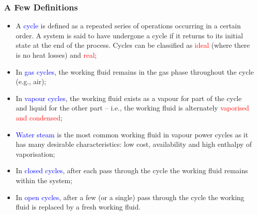 \documentclass[10pt,compress]{beamer}
\newcommand{\red}{\textcolor{red}}
\newcommand{\blue}{\textcolor{blue}}
\begin{document}
\begin{frame}
 \frametitle{A Few Definitions}
 \begin{itemize}
    \item<1-> A \blue{cycle} is defined as a repeated series of operations occurring in a certain order. A system is said to have undergone a cycle if it returns to its initial state at the end of the process.  Cycles can be classified as \red{ideal} (where there is no heat losses) and \red{real};
    \item<2-> In \blue{gas cycles}, the working fluid remains in the gas phase throughout the cycle (e.g., air);
    \item<3-> In \blue{vapour cycles}, the working fluid exists as a vapour for part of the cycle and liquid for the other part -- i.e., the working fluid is alternately \red{vaporised and condensed};
    \item<4-> \blue{Water steam} is the most common working fluid in vapour power cycles as it has many desirable characteristics: low cost, availability and high enthalpy of vaporisation;
    \item<5-> In \blue{closed cycles}, after each pass through the cycle the working fluid remains within the system;
    \item<6-> In \blue{open cycles}, after a few (or a single) pass through the cycle the working fluid is replaced by a fresh working fluid.
 \end{itemize}
\end{frame}
\end{document}
